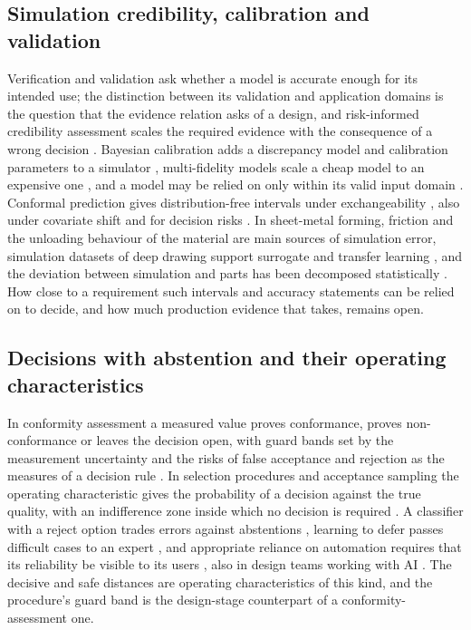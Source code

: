 \documentclass[pdflatex,sn-basic,lineno]{sn-jnl}
\begin{document}
\subsection{Simulation credibility, calibration and validation}

Verification and validation ask whether a model is accurate enough for its intended use; the distinction between its validation and application domains \citep{oberkampf2010verification} is the question that the evidence relation asks of a design, and risk-informed credibility assessment scales the required evidence with the consequence of a wrong decision \citep{asme2018assessing}. Bayesian calibration adds a discrepancy model and calibration parameters to a simulator \citep{kennedy2001bayesian}, multi-fidelity models scale a cheap model to an expensive one \citep{kennedy2000predicting}, and a model may be relied on only within its valid input domain \citep{malak2010using}. Conformal prediction gives distribution-free intervals under exchangeability \citep{lei2018distribution, barber2021predictive}, also under covariate shift \citep{tibshirani2019conformal} and for decision risks \citep{angelopoulos2024conformal}. In sheet-metal forming, friction \citep{hol2012advanced} and the unloading behaviour of the material \citep{yoshida2002model} are main sources of simulation error, simulation datasets of deep drawing support surrogate and transfer learning \citep{baum2025ddacs, heinzelmann2025comprehensive}, and the deviation between simulation and parts has been decomposed statistically \citep{baum2026statistical}. How close to a requirement such intervals and accuracy statements can be relied on to decide, and how much production evidence that takes, remains open.

\subsection{Decisions with abstention and their operating characteristics}

In conformity assessment a measured value proves conformance, proves non-conformance or leaves the decision open, with guard bands set by the measurement uncertainty and the risks of false acceptance and rejection as the measures of a decision rule \citep{iso2017decision}. In selection procedures and acceptance sampling the operating characteristic gives the probability of a decision against the true quality, with an indifference zone inside which no decision is required \citep{bechhofer1954single}. A classifier with a reject option trades errors against abstentions \citep{chow1970optimum, geifman2017selective}, learning to defer passes difficult cases to an expert \citep{madras2018predict}, and appropriate reliance on automation requires that its reliability be visible to its users \citep{lee2004trust}, also in design teams working with AI \citep{zhang2021cautionary}. The decisive and safe distances are operating characteristics of this kind, and the procedure's guard band is the design-stage counterpart of a conformity-assessment one.
\end{document}
